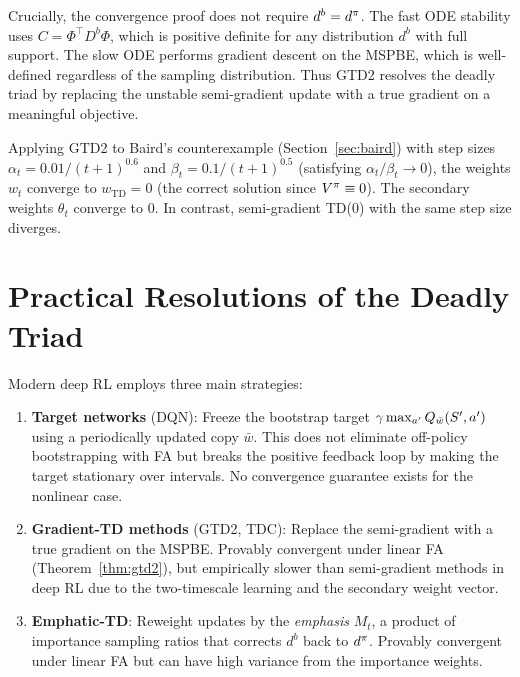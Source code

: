 \documentclass[11pt,a4paper]{article}
\begin{document}
\begin{remark}
\label{rem:gtd2_offpolicy}
Crucially, the convergence proof does not require $d^b = d^\pi$.
The fast ODE stability uses $C = \Phi^\top D^b \Phi$, which is
positive definite for any distribution $d^b$ with full support.
The slow ODE performs gradient descent on the MSPBE, which is
well-defined regardless of the sampling distribution. Thus GTD2
resolves the deadly triad by replacing the unstable semi-gradient
update with a true gradient on a meaningful objective.
\end{remark}

\begin{example}
\label{ex:gtd2_baird}
Applying GTD2 to Baird's counterexample (Section~\ref{sec:baird})
with step sizes $\alpha_t = 0.01/(t+1)^{0.6}$ and
$\beta_t = 0.1/(t+1)^{0.5}$ (satisfying $\alpha_t/\beta_t \to 0$),
the weights $w_t$ converge to $w_{\mathrm{TD}} = 0$ (the correct
solution since $V^\pi \equiv 0$). The secondary weights
$\theta_t$ converge to 0. In contrast, semi-gradient TD(0) with
the same step size diverges.
\end{example}

\section{Practical Resolutions of the Deadly Triad}
\label{sec:practical}

\begin{rlconnection}[title={Three Approaches to the Deadly Triad}]
Modern deep RL employs three main strategies:
\begin{enumerate}
  \item \textbf{Target networks} (DQN): Freeze the bootstrap target
    $\gamma \max_{a'} Q_{\bar{w}}(S', a')$ using a periodically
    updated copy $\bar{w}$. This does not eliminate off-policy
    bootstrapping with FA but breaks the positive feedback loop by
    making the target stationary over intervals. No convergence
    guarantee exists for the nonlinear case.
  \item \textbf{Gradient-TD methods} (GTD2, TDC): Replace the
    semi-gradient with a true gradient on the MSPBE. Provably
    convergent under linear FA (Theorem~\ref{thm:gtd2}), but
    empirically slower than semi-gradient methods in deep RL due to
    the two-timescale learning and the secondary weight vector.
  \item \textbf{Emphatic-TD}: Reweight updates by the
    \emph{emphasis} $M_t$, a product of importance sampling ratios
    that corrects $d^b$ back to $d^\pi$. Provably convergent
    under linear FA but can have high variance from the importance
    weights.
\end{enumerate}
\end{rlconnection}
\end{document}
